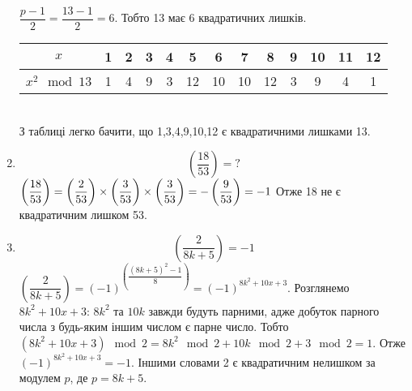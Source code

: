 \documentclass[a4paper,12pt]{article}
\begin{document}
\begin{justify}
\begin{enumerate}
			$\dfrac{p-1}{2}=\dfrac{13-1}{2}=6$. Тобто 13 має 6 квадратичних лишків.
\begin{table}[htp]\centering
\begin{tabular}{|c|c|c|c|c|c|c|c|c|c|c|c|c|}
\hline
$x$          & 1 & 2 & 3 & 4 & 5  & 6  & 7  & 8  & 9 & 10 & 11 & 12 \\ \hline
$x^2\mod 13$ & 1 & 4 & 9 & 3 & 12 & 10 & 10 & 12 & 3 & 9  & 4  & 1  \\ \hline
\end{tabular}
\end{table}\\
			З таблиці легко бачити, що 1,3,4,9,10,12 є квадратичними лишками 13.
			\item $$\left(\dfrac{18}{53}\right)=?$$
				$\left(\dfrac{18}{53}\right)=\left(\dfrac{2}{53}\right)\times\left(\dfrac{3}{53}\right)\times\left(\dfrac{3}{53}\right)=-\left(\dfrac{9}{53}\right)=-1\\\\$
				Отже 18 не є квадратичним лишком 53.
			\item $$\left(\dfrac{2}{8k+5}\right)=-1$$
				$\left(\dfrac{2}{8k+5}\right)=(-1)^{\left(\dfrac{(8k+5)^2-1}{8}\right)}=(-1)^{8k^2+10x+3}$. Розглянемо $8k^2+10x+3$: $8k^2$ та $10k$ завжди будуть парними, адже добуток парного числа з будь-яким іншим числом є парне число. Тобто $(8k^2+10x+3)\mod 2=8k^2\mod 2+10k\mod 2+3\mod 2=1$. 
				Отже $(-1)^{8k^2+10x+3}=-1$. Іншими словами 2 є квадратичним нелишком за модулем $p$, де $p=8k+5$.
 			
 	
 			
 			
 			
 			
 			
 			
 			
 			
 			
 			
 			
 			
 			
 			
 			
 			
 			
 			
 			
 			
 			
 			
 			
 			
 		\end{enumerate}
	\end{justify}
	
	
	
	
	
	
	
	
	
	
	
	
	
	
	
	
	
	
	
	
	
	
	
	
	
	
	
	
	
	
	
	
	
	
	
\end{document}
